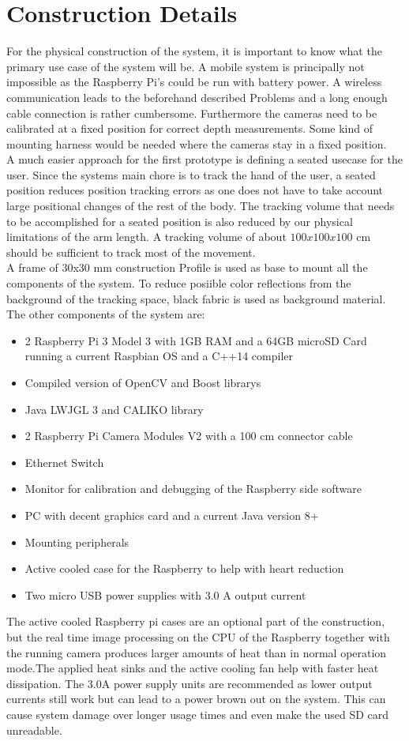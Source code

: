 \section{Construction Details}
For the physical construction of the system, it is important to know what the primary use case of the system will be. A mobile system is principally not impossible as the Raspberry Pi's could be run with battery power. A wireless communication leads to the beforehand described Problems and a long enough cable connection is rather cumbersome. Furthermore the cameras need to be calibrated at a fixed position for correct depth measurements. Some kind of mounting harness would be needed where the cameras stay in a fixed position.\\
A much easier approach for the first prototype is defining a seated usecase for the user. Since the systems main chore is to track the hand of the user, a seated position reduces position tracking errors as one does not have to take account large positional changes of the rest of the body.
The tracking volume that needs to be accomplished for a seated position is also reduced by our physical limitations of the arm length. A tracking volume of about $100x100x100$ cm should be sufficient to track most of the movement.\\
A frame of 30x30 mm construction Profile is used as base to mount all the components of the system. To reduce posiible color reflections from the background of the tracking space, black fabric is used as background material. The other components of the system are:
\begin{itemize}
\item 2 Raspberry Pi 3 Model 3 with 1GB RAM and a 64GB microSD Card running a current Raspbian OS and a C++14 compiler
\item Compiled version of OpenCV and Boost librarys
\item Java LWJGL 3 and CALIKO library
\item 2 Raspberry Pi Camera Modules V2 with a 100 cm connector cable
\item Ethernet Switch
\item Monitor for calibration and debugging of the Raspberry side software
\item PC with decent graphics card and a current Java version 8+
\item Mounting peripherals
\item Active cooled case for the Raspberry to help with heart reduction
\item Two micro USB power supplies with 3.0 A output current
\end{itemize}
The active cooled Raspberry pi cases are an optional part of the construction, but the real time image processing on the CPU of the Raspberry together with the running camera produces larger amounts of heat than in normal operation mode.The applied heat sinks and the active cooling fan help with faster heat dissipation. The 3.0A power supply units are recommended as lower output currents still work but can lead to a power brown out on the system. This can cause system damage over longer usage times and even make the used SD card unreadable.
